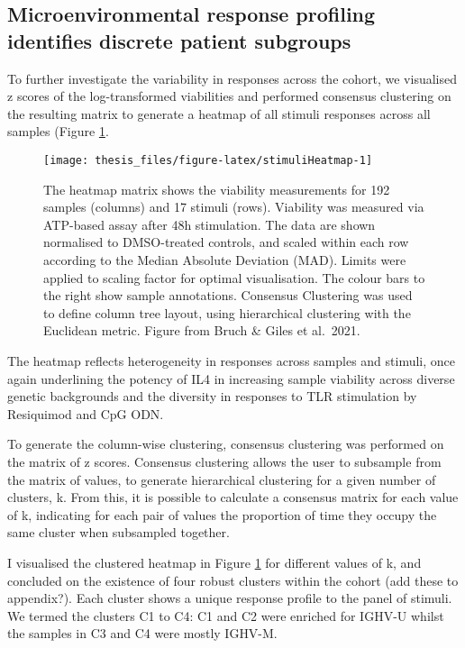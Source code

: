\documentclass[11pt, a4paper, twosided]{book}
\begin{document}
\hypertarget{clusters}{%
\subsection{Microenvironmental response profiling identifies discrete patient subgroups}\label{clusters}}

To further investigate the variability in responses across the cohort, we visualised z scores of the log-transformed viabilities and performed consensus clustering on the resulting matrix to generate a heatmap of all stimuli responses across all samples (Figure \ref{fig:stimuliHeatmap}.


\begin{figure}

{\centering \texttt{[image: thesis\_files/figure-latex/stimuliHeatmap-1]} 

}

\caption{The heatmap matrix shows the viability measurements for 192 samples (columns) and 17 stimuli (rows). Viability was measured via ATP-based assay after 48h stimulation. The data are shown normalised to DMSO-treated controls, and scaled within each row according to the Median Absolute Deviation (MAD). Limits were applied to scaling factor for optimal visualisation. The colour bars to the right show sample annotations. Consensus Clustering was used to define column tree layout, using hierarchical clustering with the Euclidean metric. Figure from Bruch \& Giles et al.~2021.}\label{fig:stimuliHeatmap}
\end{figure}
The heatmap reflects heterogeneity in responses across samples and stimuli, once again underlining the potency of IL4 in increasing sample viability across diverse genetic backgrounds and the diversity in responses to TLR stimulation by Resiquimod and CpG ODN.

To generate the column-wise clustering, consensus clustering was performed on the matrix of z scores. Consensus clustering allows the user to subsample from the matrix of values, to generate hierarchical clustering for a given number of clusters, k. From this, it is possible to calculate a consensus matrix for each value of k, indicating for each pair of values the proportion of time they occupy the same cluster when subsampled together.

I visualised the clustered heatmap in Figure \ref{fig:stimuliHeatmap} for different values of k, and concluded on the existence of four robust clusters within the cohort (add these to appendix?). Each cluster shows a unique response profile to the panel of stimuli. We termed the clusters C1 to C4: C1 and C2 were enriched for IGHV-U whilst the samples in C3 and C4 were mostly IGHV-M.
\end{document}
